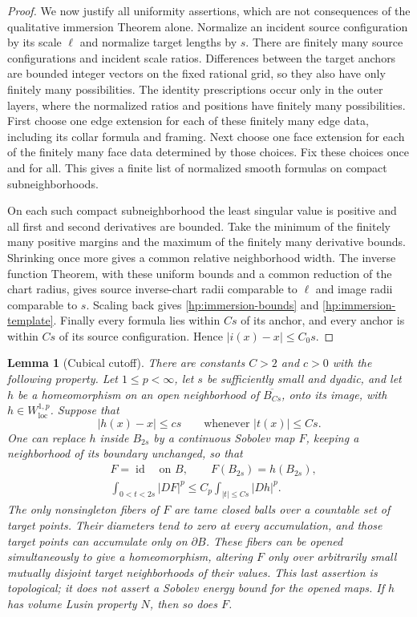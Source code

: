 \documentclass[11pt]{article}
\numberwithin{equation}{section}
\newtheorem{lemma}[theorem]{Lemma}
\theoremstyle{definition}
\theoremstyle{remark}
\newcommand{\Id}{\operatorname{id}}
\begin{document}
\begin{proof}
We now justify all uniformity assertions, which are not consequences
of the qualitative immersion Theorem alone.  Normalize an incident
source configuration by its scale $\ell$ and normalize target lengths
by $s$.  There are finitely many source configurations and incident
scale ratios.  Differences between the target anchors are bounded
integer vectors on the fixed rational grid, so they also have only
finitely many possibilities.  The identity prescriptions occur only
in the outer layers, where the normalized ratios and positions have
finitely many possibilities.  First choose one edge extension for each
of these finitely many edge data, including its collar formula and
framing.  Next choose one face extension for each of the finitely many
face data determined by those choices.  Fix these choices once and
for all.  This gives a finite list of normalized smooth formulas on
compact subneighborhoods.

On each such compact subneighborhood the least singular value is
positive and all first and second derivatives are bounded.  Take the
minimum of the finitely many positive margins and the maximum of the
finitely many derivative bounds.  Shrinking once more gives a common
relative neighborhood width.  The inverse function Theorem, with
these uniform bounds and a common reduction of the chart radius,
gives source inverse-chart radii comparable to $\ell$ and image radii
comparable to $s$.  Scaling back gives
\eqref{hp:immersion-bounds} and
\eqref{hp:immersion-template}.  Finally every formula lies within
$Cs$ of its anchor, and every anchor is within $Cs$ of its source
configuration.  Hence $|i(x)-x|\leq C_0s$.
\end{proof}

\begin{lemma}[Cubical cutoff]\label{hp:cutoff}
There are constants $C>2$ and $c>0$ with the following property.
Let $1\leq p<\infty$, let $s$ be sufficiently small and dyadic, and
let $h$ be a homeomorphism on an open neighborhood of
$\overline{B_{Cs}}$, onto its image, with
$h\in W^{1,p}_{\mathrm{loc}}$.  Suppose that
\begin{equation}\label{hp:cutoff-closeness}
 |h(x)-x|\leq cs\qquad\text{whenever }|t(x)|\leq Cs.
\end{equation}
One can replace $h$ inside $B_{2s}$ by a continuous Sobolev map $F$,
keeping a neighborhood of its boundary unchanged, so that
\begin{align}
 &F=\Id\quad\text{on }B,
 \qquad F(B_{2s})=h(B_{2s}),\label{hp:cutoff-image}\\
 &\int_{0<t<2s}|DF|^p
 \leq C_p\int_{|t|\leq Cs}|Dh|^p.\label{hp:cutoff-energy}
\end{align}
The only nonsingleton fibers of $F$ are tame closed balls over a
countable set of target points.  Their diameters tend to zero at every
accumulation, and those target points can accumulate only on
$\partial B$.  These fibers can be opened simultaneously to give a
homeomorphism, altering $F$ only over arbitrarily small mutually
disjoint target neighborhoods of their values.  This last assertion
is topological; it does not assert a Sobolev energy bound for the
opened maps.  If $h$ has volume Lusin property $N$, then so does $F$.
\end{lemma}
\end{document}
